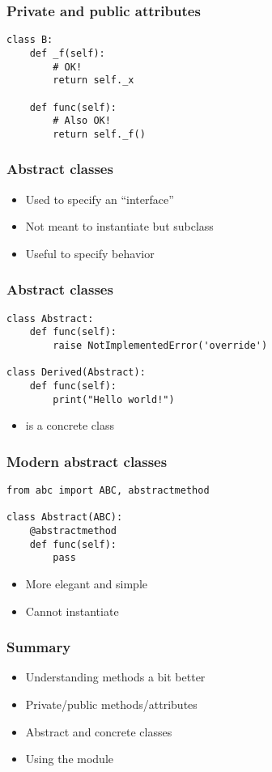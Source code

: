 \documentclass[14pt,compress,aspectratio=169]{beamer}
\begin{document}
\begin{frame}[fragile]
  \frametitle{Private and public attributes}
\begin{lstlisting}
class B:
    def _f(self):
        # OK!
        return self._x

    def func(self):
        # Also OK!
        return self._f()
\end{lstlisting}
\end{frame}

\begin{frame}
  \frametitle{Abstract classes}
  \begin{itemize}
  \item Used to specify an ``interface''
  \item Not meant to instantiate but subclass
  \item Useful to specify behavior
  \end{itemize}
\end{frame}

\begin{frame}[fragile]
  \frametitle{Abstract classes}
\begin{lstlisting}
class Abstract:
    def func(self):
        raise NotImplementedError('override')

class Derived(Abstract):
    def func(self):
        print("Hello world!")
\end{lstlisting}
  \begin{itemize}
  \item {} is a concrete class
  \end{itemize}
\end{frame}

\begin{frame}[fragile]
  \frametitle{Modern abstract classes}
\begin{lstlisting}
from abc import ABC, abstractmethod

class Abstract(ABC):
    @abstractmethod
    def func(self):
        pass
\end{lstlisting}
  \begin{itemize}
  \item More elegant and simple
  \item Cannot instantiate 
  \end{itemize}
\end{frame}


\begin{frame}
  \frametitle{Summary}
  \begin{itemize}
  \item Understanding methods a bit better
  \item Private/public methods/attributes
  \item Abstract and concrete classes
  \item Using the  module
  \end{itemize}
\end{frame}
\end{document}
